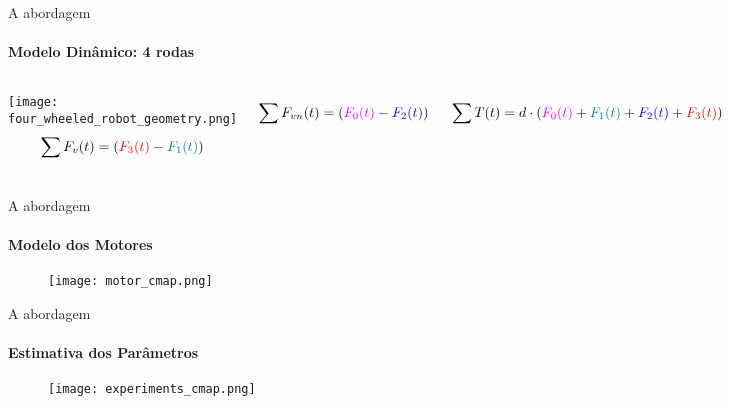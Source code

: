 \begin{frame}[t]{A abordagem}
  \transboxout[duration=0.5]
  \framesubtitle{Modelo Dinâmico: 4 rodas}
  \begin{columns}
    \texttt{[image: four\_wheeled\_robot\_geometry.png]}
      \begin{equation*}
        \sum F_v(t) = 
        \left(
          {\color[rgb]{1,0,0} F_3(t)} - 
          {\color[rgb]{0,0.5,0.5} F_1(t)}
        \right)
      \end{equation*}

      \begin{equation*}
        \sum F_{vn}(t) = 
        \left(
          {\color[rgb]{1,0,1} F_0(t)} - 
          {\color[rgb]{0,0,1} F_2(t)}
        \right)
      \end{equation*}

      \begin{equation*}
        \sum T(t) = 
        d\cdot
        \left(
          {\color[rgb]{1,0,1} F_0(t)} + 
          {\color[rgb]{0,0.5,0.5} F_1(t)} +
          {\color[rgb]{0,0,1} F_2(t)} +
          {\color[rgb]{1,0,0} F_3(t)} 
        \right)
      \end{equation*}
  \end{columns}
\end{frame}

\begin{frame}[c]{A abordagem}
  \framesubtitle{Modelo dos Motores}
  \transdissolve[duration=0.5]

  \begin{figure}[ht!]
    \centering

    \texttt{[image: motor\_cmap.png]}
    \label{fig:motor_cmap}

  \end{figure}


\end{frame}

\begin{frame}[c]{A abordagem}
  \framesubtitle{Estimativa dos Parâmetros}
  \transdissolve[duration=0.5]

  \begin{figure}[ht!]
    \centering

    \texttt{[image: experiments\_cmap.png]}
    \label{fig:experiments}

  \end{figure}


\end{frame}